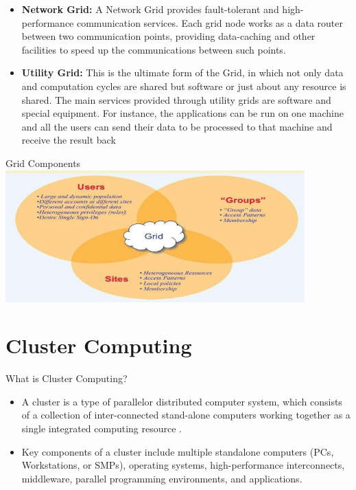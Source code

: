 \documentclass{SKP-beamer}
\begin{document}
\begin{frame}{}
	\begin{itemize}
		
		\item \textbf{Network Grid:} A Network Grid provides fault-tolerant and high-performance communication 
		services. Each grid node works as a data router between two communication points, 
		providing data-caching and other facilities to speed up the communications between such 
		points.
		
		\item  \textbf{Utility Grid:} This is the ultimate form of the Grid, in which not only data and computation 
		cycles are shared but software or just about any resource is shared. The main services 
		provided through utility grids are software and special equipment. For instance, the 
		applications can be run on one machine and all the users can send their data to be 
		processed to that machine and receive the result back
		
	\end{itemize}
\end{frame}

\begin{frame}{Grid Components}
	\includegraphics[scale=1.2]{6.png}
\end{frame}


\section{\textbf{Cluster Computing}}



\begin{frame}{What is Cluster Computing?}
	\begin{itemize}
		
		\item   A cluster is a type of parallelor distributed
		computer system, which consists of a
		collection of inter-connected stand-alone computers 
		working together as a single integrated
		computing resource .
		\item Key components of a cluster include multiple 
		standalone computers (PCs, Workstations, or SMPs), 
		operating systems, high-performance interconnects, 
		middleware, parallel programming environments, and
		applications.
		
	\end{itemize}
\end{frame}
\end{document}
